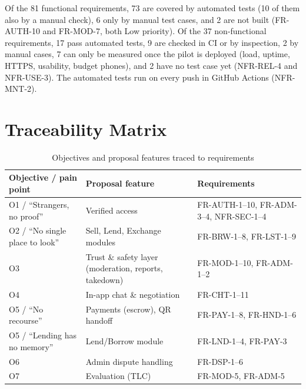 \documentclass[11pt,a4paper]{scrreprt}
\begin{document}
Of the 81 functional requirements, 73 are covered by automated tests (10 of
them also by a manual check), 6 only by manual test cases, and 2 are not
built (FR-AUTH-10 and FR-MOD-7, both Low priority). Of the 37 non-functional
requirements, 17 pass automated tests, 9 are checked in CI or by inspection, 2
by manual cases, 7 can only be measured once the pilot is deployed (load,
uptime, HTTPS, usability, budget phones), and 2 have no test case yet
(NFR-REL-4 and NFR-USE-3). The automated tests run on every push in GitHub
Actions (NFR-MNT-2).

\section{Traceability Matrix}
\begin{longtable}{L{4.4cm} L{4.4cm} L{5.9cm}}
\caption{Objectives and proposal features traced to requirements}\label{tab:trace}\\
\toprule
\textbf{Objective / pain point} & \textbf{Proposal feature} & \textbf{Requirements}\\ \midrule\endhead
O1 / ``Strangers, no proof'' & Verified access & FR-AUTH-1--10, FR-ADM-3--4, NFR-SEC-1--4\\
O2 / ``No single place to look'' & Sell, Lend, Exchange modules & FR-BRW-1--8, FR-LST-1--9\\
O3 & Trust \& safety layer (moderation, reports, takedown) & FR-MOD-1--10, FR-ADM-1--2\\
O4 & In-app chat \& negotiation & FR-CHT-1--11\\
O5 / ``No recourse'' & Payments (escrow), QR handoff & FR-PAY-1--8, FR-HND-1--6\\
O5 / ``Lending has no memory'' & Lend/Borrow module & FR-LND-1--4, FR-PAY-3\\
O6 & Admin dispute handling & FR-DSP-1--6\\
O7 & Evaluation (TLC) & FR-MOD-5, FR-ADM-5\\
\bottomrule
\end{longtable}

\appendix
\end{document}
